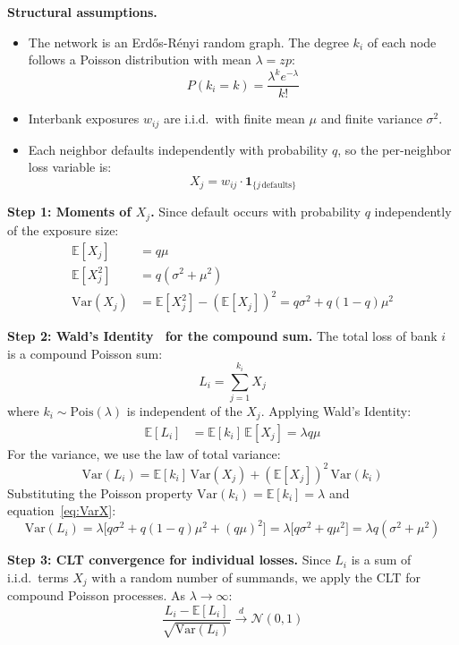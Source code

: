 \documentclass[a4paper,12pt,twoside]{article}
\begin{document}
\textbf{Structural assumptions.}
\begin{itemize}
    \item The network is an Erdős-Rényi random graph. The degree $k_i$ 
    of each node follows a Poisson distribution with mean $\lambda = zp$:
    \[
        P(k_i = k) = \frac{\lambda^k e^{-\lambda}}{k!}
    \]
    \item Interbank exposures $w_{ij}$ are i.i.d.\ with finite mean 
    $\mu$ and finite variance $\sigma^2$.
    \item Each neighbor defaults independently with probability $q$, 
    so the per-neighbor loss variable is:
    \[
        X_j = w_{ij} \cdot \mathbf{1}_{\{j\,\text{defaults}\}}
    \]
\end{itemize}

\textbf{Step 1: Moments of $X_j$.}
Since default occurs with probability $q$ independently of the exposure 
size:
\begin{align}
    \mathbb{E}[X_j] &= q\mu \label{eq:EX}\\
    \mathbb{E}[X_j^2] &= q(\sigma^2 + \mu^2) \label{eq:EX2}\\
    \text{Var}(X_j) &= \mathbb{E}[X_j^2] - (\mathbb{E}[X_j])^2 
    = q\sigma^2 + q(1-q)\mu^2 \label{eq:VarX}
\end{align}

\textbf{Step 2: Wald's Identity~\cite{wald1944} for the compound sum.}
The total loss of bank $i$ is a compound Poisson sum:
\[
    L_i = \sum_{j=1}^{k_i} X_j
\]
where $k_i \sim \text{Pois}(\lambda)$ is independent of the $X_j$. 
Applying Wald's Identity:
\begin{align}
    \mathbb{E}[L_i] &= \mathbb{E}[k_i]\,\mathbb{E}[X_j] 
    = \lambda q\mu \label{eq:ELi}
\end{align}
For the variance, we use the law of total variance:
\begin{equation}
    \text{Var}(L_i) = \mathbb{E}[k_i]\,\text{Var}(X_j) + 
    (\mathbb{E}[X_j])^2\,\text{Var}(k_i)
    \label{eq:VarLi_general}
\end{equation}
Substituting the Poisson property $\text{Var}(k_i) = \mathbb{E}[k_i] 
= \lambda$ and equation~\eqref{eq:VarX}:
\begin{equation}
    \text{Var}(L_i) = \lambda\bigl[q\sigma^2 + q(1-q)\mu^2 + 
    (q\mu)^2\bigr] = \lambda\bigl[q\sigma^2 + q\mu^2\bigr]
    = \lambda q(\sigma^2 + \mu^2)
    \label{eq:VarLi}
\end{equation}

\textbf{Step 3: CLT convergence for individual losses.}
Since $L_i$ is a sum of i.i.d.\ terms $X_j$ with a random number of 
summands, we apply the CLT for compound Poisson processes. As 
$\lambda \to \infty$:
\begin{equation}
    \frac{L_i - \mathbb{E}[L_i]}{\sqrt{\text{Var}(L_i)}} 
    \xrightarrow{d} \mathcal{N}(0,1)
    \label{eq:CLT_individual}
\end{equation}
\end{document}
